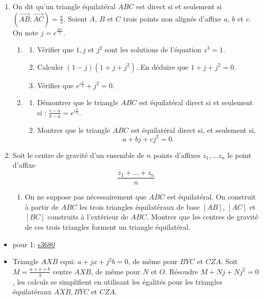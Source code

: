 \documentclass[a4paper,12pt]{article}
\begin{document}
\begin{tcolorbox}[title={Exercice 18 - {[}Représenter, Calculer, Raisonner{]}}]
\begin{enumerate}
    \item On dit qu'un triangle équilatéral $ABC$ est direct si et seulement si $(\overrightarrow{AB}; \overrightarrow{AC}) = \frac{\pi}{3}$.
    Soient \( A \), \( B \) et \( C \) trois points non alignés d’affixe \( a \), \( b \) et \( c \). On note \( j = e^{\frac{2i\pi}{3}} \).
    \begin{enumerate}
        \item \begin{enumerate}
            \item Vérifier que $1, j$ et $j^2$ sont les solutions de l'équation $z^3 = 1$.
            \item Calculer $(1-j)(1 + j + j^2)$. En déduire que $1 + j + j^2 = 0$.
            \item Vérifier que $e^{i\frac{\pi}{3}} + j^2 = 0$.
        \end{enumerate}
        \item \begin{enumerate}
            \item Démontrer que le triangle $ABC$ est équilatéral direct si et seulement si : $\frac{c - a}{b - a} = e^{i\frac{\pi}{3}}$.
            \item Montrer que le triangle \( ABC \) est équilatéral direct si, et seulement si,
            \[
            a + bj + cj^2 = 0.
            \]
        \end{enumerate}
    \end{enumerate}
    \item Soit le centre de gravité d'un ensemble de $n$ points d'affixes $z_1, \dots z_n$ le point d'affixe
    $$\dfrac{z_1 + \dots + z_n}{n}$$ 
    \begin{enumerate}
        \item On ne suppose pas nécessairement que \( ABC \) est équilatéral. On construit à partir de \( ABC \) les trois triangles équilatéraux de base \([AB]\), \([AC]\) et \([BC]\) construits à l’extérieur de \( ABC \). Montrer que les centres de gravité de ces trois triangles forment un triangle équilatéral.
    \end{enumerate}
\end{enumerate}
\end{tcolorbox}

\begin{solutionbox}
\begin{itemize}
    \item pour 1: \href{https://aidemaths.com/_exos/s3670.pdf}{s3680}
    \item Triangle $AXB$ equi: $a+jx+j^2b = 0$, de même pour $BYC$ et $CZA$. Soit $M = \frac{a + x + b}{3}$ centre $AXB$, de même pour $N$ et $O$.
    Résoudre $M + Nj + Nj^2 = 0$, les calculs se simplifient en utilisant les égalités pour les triangles équilatéraux $AXB, BYC$ et $CZA$.
\end{itemize}
\end{solutionbox}
\end{document}
